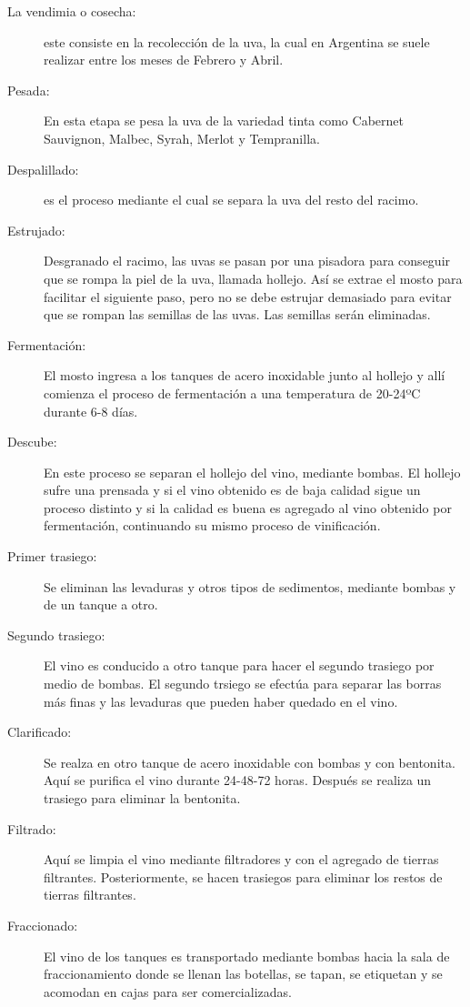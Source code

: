 \begin{description}
  \item[La vendimia o cosecha:] este consiste en la recolección de la uva, la cual en Argentina se suele realizar entre los meses de Febrero y Abril.
  \item[Pesada:] En esta etapa se pesa la uva de la variedad tinta como Cabernet Sauvignon, Malbec, Syrah, Merlot y Tempranilla.
  \item[Despalillado:] es el proceso mediante el cual se separa la uva del resto del racimo.
  \item[Estrujado:] Desgranado el racimo, las uvas se pasan por una pisadora para conseguir que se rompa la piel de la uva, llamada hollejo. Así se extrae el mosto para facilitar el siguiente paso, pero no se debe estrujar demasiado para evitar que se rompan las semillas de las uvas. Las semillas serán eliminadas.
  \item[Fermentación:] El mosto ingresa a los tanques de acero inoxidable junto al hollejo y allí comienza el proceso de fermentación a una temperatura de 20-24ºC durante 6-8 días.
  \item[Descube:] En este proceso se separan el hollejo del vino, mediante bombas. El hollejo sufre una prensada y si el vino obtenido es de baja calidad sigue un proceso distinto y si la calidad es buena es agregado al vino obtenido por fermentación, continuando su mismo proceso de vinificación.
  \item[Primer trasiego:] Se eliminan las levaduras y otros tipos de sedimentos, mediante bombas y de un tanque a otro.
  \item[Segundo trasiego:] El vino es conducido a otro tanque para hacer el segundo trasiego por medio de bombas. El segundo trsiego se efectúa para separar las borras más finas y las levaduras que pueden haber quedado en el vino.
  \item[Clarificado:] Se realza en otro tanque de acero inoxidable con bombas y con bentonita. Aquí se purifica el vino durante 24-48-72 horas. Después se realiza un trasiego para eliminar la bentonita.
  \item[Filtrado:] Aquí se limpia el vino mediante filtradores y con el agregado de tierras filtrantes. Posteriormente, se hacen trasiegos para eliminar los restos de tierras filtrantes.
  \item[Fraccionado:] El vino de los tanques es transportado mediante bombas hacia la sala de fraccionamiento donde se llenan las botellas, se tapan, se etiquetan y se acomodan en cajas para ser comercializadas.
\end{description}

